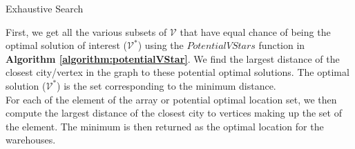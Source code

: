 \documentclass[longpaper, english, final, times]{revdetua}
\begin{document}
		\begin{algorithm}[!h]
			\caption{Exhaustive Search}
			\label{algorithm:exhaustiveSearch}
			\DontPrintSemicolon
			
			
		\end{algorithm}
		
		First, we get all the various subsets of $\mathcal{V}$ that have equal chance of being the optimal solution of interest ($\mathcal{V^{*}}$) using the $PotentialVStars$ function in \textbf{Algorithm \ref{algorithm:potentialVStar}}. We find the largest distance of the closest city/vertex in the graph to these potential optimal solutions. The optimal solution ($\mathcal{V^{*}}$) is the set corresponding to the minimum distance.\\
			
		For each of the element of the array or potential optimal location set, we then compute the largest distance of the closest city to vertices making up the set of the element. The minimum is then returned as the optimal location for the warehouses.
		
\end{document}

